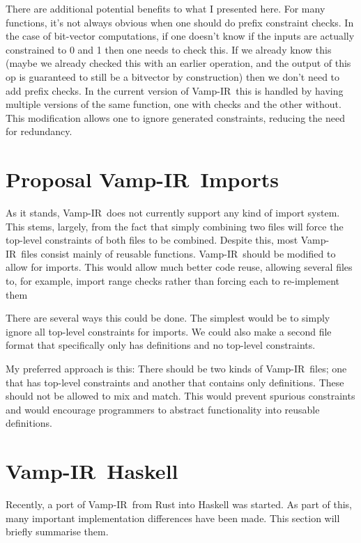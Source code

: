 \documentclass{msc}
\newcommand{\vampir}{Vamp-IR}
\begin{document}
There are additional potential benefits to what I presented here. For many functions, it's not always obvious when one should do prefix constraint checks. In the case of bit-vector computations, if one doesn't know if the inputs are actually constrained to 0 and 1 then one needs to check this. If we already know this (maybe we already checked this with an earlier operation, and the output of this op is guaranteed to still be a bitvector by construction) then we don't need to add prefix checks. In the current version of \vampir\ this is handled by having multiple versions of the same function, one with checks and the other without. This modification allows one to ignore generated constraints, reducing the need for redundancy.

\section{Proposal \vampir\ Imports}

As it stands, \vampir\ does not currently support any kind of import system. This stems, largely, from the fact that simply combining two files will force the top-level constraints of both files to be combined. Despite this, most \vampir\ files consist mainly of reusable functions. \vampir\ should be modified to allow for imports. This would allow much better code reuse, allowing several files to, for example, import range checks rather than forcing each to re-implement them

There are several ways this could be done. The simplest would be to simply ignore all top-level constraints for imports. We could also make a second file format that specifically only has definitions and no top-level constraints.

My preferred approach is this: There should be two kinds of \vampir\ files; one that has top-level constraints and another that contains only definitions. These should not be allowed to mix and match. This would prevent spurious constraints and would encourage programmers to abstract functionality into reusable definitions.

\section{\vampir\ Haskell}

Recently, a port of \vampir\ from Rust into Haskell was started. As part of this, many important implementation differences have been made. This section will briefly summarise them.
\end{document}

